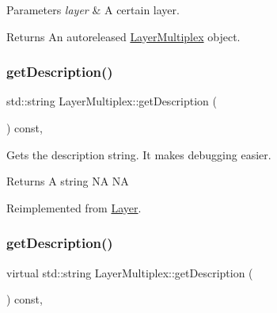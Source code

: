 \begin{DoxyParams}{Parameters}
{\em layer} & A certain layer. \\
\hline
\end{DoxyParams}
\begin{DoxyReturn}{Returns}
An autoreleased \hyperlink{classLayerMultiplex}{Layer\+Multiplex} object. 
\end{DoxyReturn}
\mbox{\label{classLayerMultiplex_a60e44b51edd0e10a3601bf5e5094c30d}} 
\subsubsection{\texorpdfstring{get\+Description()}{getDescription()}\hspace{0.1cm}{\footnotesize\ttfamily [1/2]}}
{\footnotesize\ttfamily std\+::string Layer\+Multiplex\+::get\+Description (\begin{DoxyParamCaption}{ }\end{DoxyParamCaption}) const\hspace{0.3cm}{\ttfamily [override]}, {\ttfamily [virtual]}}

Gets the description string. It makes debugging easier. \begin{DoxyReturn}{Returns}
A string  NA  NA 
\end{DoxyReturn}


Reimplemented from \hyperlink{classLayer_acadcdf383e0bf892c95213a4f7725672}{Layer}.

\mbox{\label{classLayerMultiplex_ab87bcf38601d2ef54325b95e22565d31}} 
\subsubsection{\texorpdfstring{get\+Description()}{getDescription()}\hspace{0.1cm}{\footnotesize\ttfamily [2/2]}}
{\footnotesize\ttfamily virtual std\+::string Layer\+Multiplex\+::get\+Description (\begin{DoxyParamCaption}{ }\end{DoxyParamCaption}) const\hspace{0.3cm}{\ttfamily [override]}, {\ttfamily [virtual]}}

